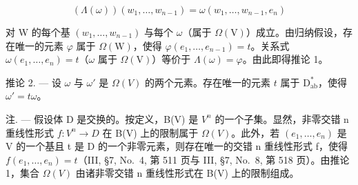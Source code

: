 \[
(\Lambda (\omega)) (w _ {1}, \ldots , w _ {n - 1}) = \omega (w _ {1}, \ldots , w _ {n - 1}, e _ {n})
\]

对 W 的每个基 \((w_{1},\ldots,w_{n-1})\) 与每个 \(\omega\)（属于 \(\Omega(\mathrm{V})\)）成立。由归纳假设，存在唯一的元素 \(\varphi\) 属于 \(\Omega(\mathrm{W})\)，使得 \(\varphi(e_{1},\ldots,e_{n-1})=t\)。关系式 \(\omega(e_{1},\ldots,e_{n})=t\)（\(\omega\) 属于 \(\Omega(\mathrm{V})\)）等价于 \(\Lambda(\omega)=\varphi\)。由此即得推论 1。

推论 2. --- 设 \(\omega\) 与 \(\omega'\) 是 \(\Omega(V)\) 的两个元素。存在唯一的元素 \(t\) 属于 \(\mathrm{D}_{\mathrm{ab}}^{*}\)，使得 \(\omega' = t\omega\)。

注. --- 假设体 D 是交换的。按定义，B(V) 是 \(V^{n}\) 的一个子集。显然，非零交错 n 重线性形式 \(f: V^{n} \to D\) 在 B(V) 上的限制属于 \(\Omega(V)\)。此外，若 \((e_{1}, \ldots, e_{n})\) 是 V 的一个基且 t 是 D 的一个非零元素，则存在唯一的交错 n 重线性形式 f，使得 \(f(e_{1}, \ldots, e_{n}) = t\)（III, §7, No.~4, 第 511 页与 III, §7, No.~8, 第 518 页）。由推论 1，集合 \(\Omega(V)\) 由诸非零交错 n 重线性形式在 B(V) 上的限制组成。

